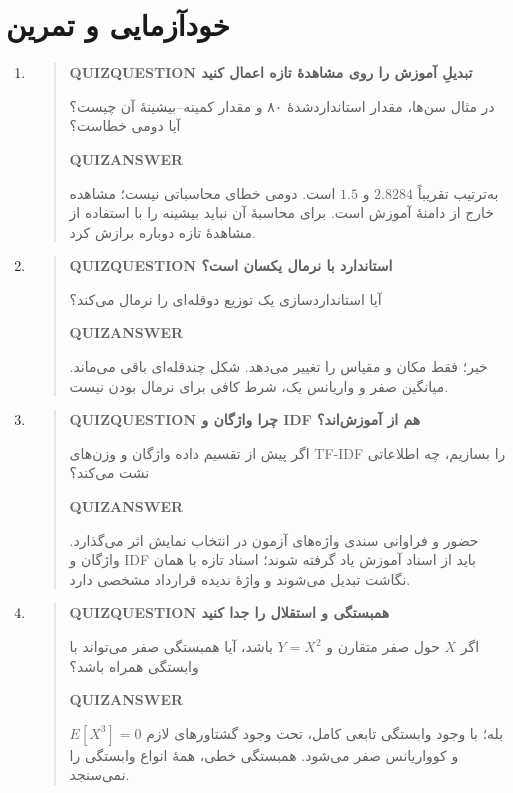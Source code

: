 \section{خودآزمایی و تمرین}
\begin{enumerate}
\item\begin{quote}\textbf{QUIZQUESTION تبدیلِ آموزش را روی مشاهدهٔ تازه اعمال کنید}\par 
در مثال سن‌ها، مقدار استانداردشدهٔ ۸۰ و مقدار کمینه–بیشینهٔ آن چیست؟ آیا دومی خطاست؟
\par\textbf{QUIZANSWER}\par به‌ترتیب تقریباً $2.8284$ و $1.5$ است. دومی خطای محاسباتی نیست؛ مشاهده خارج از دامنهٔ آموزش است. برای محاسبهٔ آن نباید بیشینه را با استفاده از مشاهدهٔ تازه دوباره برازش کرد.\par 
\end{quote}
\item\begin{quote}\textbf{QUIZQUESTION استاندارد با نرمال یکسان است؟}\par 
آیا استانداردسازی یک توزیع دو‌قله‌ای را نرمال می‌کند؟
\par\textbf{QUIZANSWER}\par خیر؛ فقط مکان و مقیاس را تغییر می‌دهد. شکل چندقله‌ای باقی می‌ماند. میانگین صفر و واریانس یک، شرط کافی برای نرمال بودن نیست.\par 
\end{quote}
\item\begin{quote}\textbf{QUIZQUESTION چرا واژگان و IDF هم از آموزش‌اند؟}\par 
اگر پیش از تقسیم داده واژگان و وزن‌های TF-IDF را بسازیم، چه اطلاعاتی نشت می‌کند؟
\par\textbf{QUIZANSWER}\par حضور و فراوانی سندی واژه‌های آزمون در انتخاب نمایش اثر می‌گذارد. واژگان و IDF باید از اسناد آموزش یاد گرفته شوند؛ اسناد تازه با همان نگاشت تبدیل می‌شوند و واژهٔ ندیده قرارداد مشخصی دارد.\par 
\end{quote}
\item\begin{quote}\textbf{QUIZQUESTION همبستگی و استقلال را جدا کنید}\par 
اگر $X$ حول صفر متقارن و $Y=X^2$ باشد، آیا همبستگی صفر می‌تواند با وابستگی همراه باشد؟
\par\textbf{QUIZANSWER}\par بله؛ با وجود وابستگی تابعی کامل، تحت وجود گشتاورهای لازم $E[X^3]=0$ و کوواریانس صفر می‌شود. همبستگی خطی، همهٔ انواع وابستگی را نمی‌سنجد.\par 

\end{quote}
\end{enumerate}
